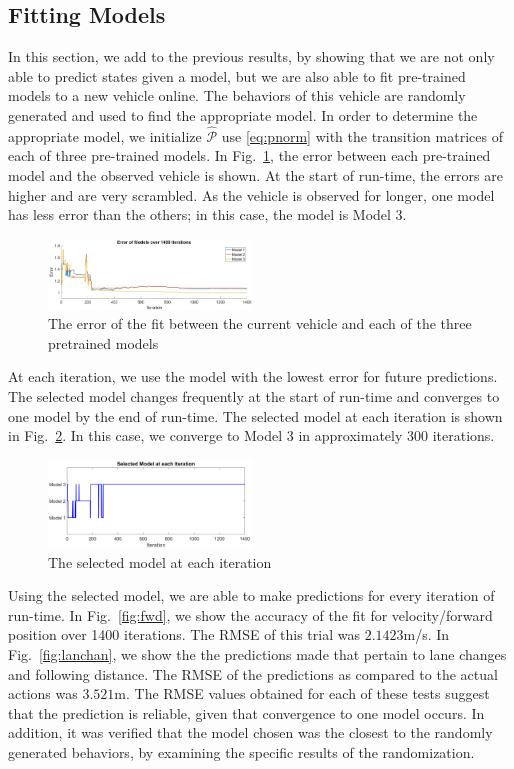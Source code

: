 \documentclass[letterpaper, 10 pt, conference]{ieeeconf}  %
\begin{document}
\subsection{Fitting Models}
In this section, we add to the previous results, by showing that we are not only able to predict states given a model, but we are also able to fit pre-trained models to a new vehicle online. The behaviors of this vehicle are randomly generated and used to find the appropriate model. In order to determine the appropriate model, we initialize $\hat{\mathcal{P}}$ use \eqref{eq:pnorm} with the transition matrices of each of three pre-trained models. In Fig.~\ref{fig:error}, the error between each pre-trained model and the observed vehicle is shown. At the start of run-time, the errors are higher and are very scrambled. As the vehicle is observed for longer, one model has less error than the others; in this case, the model is Model $3$. 

\begin{figure}[ht]
    \includegraphics[width=0.48\textwidth]{fig/modelerror.png}
    \caption{The error of the fit between the current vehicle and each of the three pretrained models} \label{fig:error}
\end{figure}

At each iteration, we use the model with the lowest error for future predictions. The selected model changes frequently at the start of run-time and converges to one model by the end of run-time. The selected model at each iteration is shown in Fig.~\ref{fig:select}. In this case, we converge to Model $3$ in approximately 300 iterations.
\begin{figure}[ht]
    \includegraphics[width=0.48\textwidth]{fig/modelselect.png}
    \caption{The selected model at each iteration} \label{fig:select}
\end{figure}
Using the selected model, we are able to make predictions for every iteration of run-time. In Fig.~\ref{fig:fwd}, we show the accuracy of the fit for velocity/forward position over 1400 iterations. The RMSE of this trial was $2.1423$m/s. In Fig.~\ref{fig:lanchan}, we show the the predictions made that pertain to lane changes and following distance. The RMSE of the predictions as compared to the actual actions was $3.521$m. The RMSE values obtained for each of these tests suggest that the prediction is reliable, given that convergence to one model occurs. In addition, it was verified that the model chosen was the closest to the randomly generated behaviors, by examining the specific results of the randomization.
\end{document}
